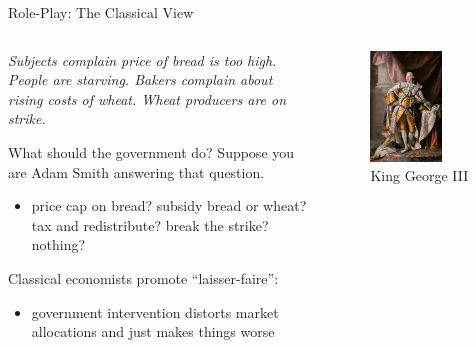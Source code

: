 \begin{frame}{Role-Play: The Classical View}
\protect\hypertarget{role-play-the-classical-view}{}
\begin{columns}[T]
\begin{column}{0.6\textwidth}
\emph{Subjects complain price of bread is too high. People are starving.
Bakers complain about rising costs of wheat. Wheat producers are on
strike.}

What should the government do? Suppose you are Adam Smith answering that
question.

\pause

\begin{itemize}
\tightlist
\item
  price cap on bread? subsidy bread or wheat? tax and redistribute?
  break the strike? nothing?
\end{itemize}

\pause

Classical economists promote ``laisser-faire'':

\begin{itemize}
\tightlist
\item
  government intervention distorts market allocations and just makes
  things worse
\end{itemize}
\end{column}

\begin{column}{0.4\textwidth}

\begin{figure}
\centering
\includegraphics[width=0.7\textwidth,height=\textheight]{assets/george_3.jpg}
\caption{King George III}
\end{figure}


\end{column}
\end{columns}
\end{frame}
